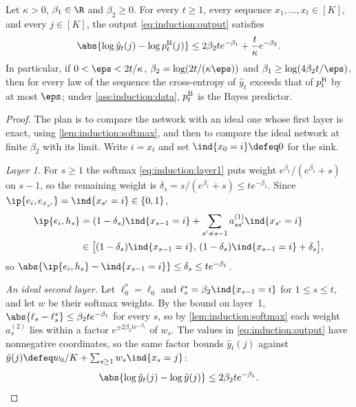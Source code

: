 \begin{refsection}
\begin{theorem}\label{thm:induction:circuit}
Let $\kappa>0$, $\beta_1\in\R$ and $\beta_2\ge0$. For every $t\ge1$, every sequence $x_1,\dots,x_t\in[K]$, and every $j\in[K]$, the output \eqref{eq:induction:output} satisfies
\begin{equation}\label{eq:induction:circuit}
  \abs{\log\hat y_t(j)-\log\indpb_t(j)}\le2\beta_2te^{-\beta_1}+\frac{t}{\kappa}e^{-\beta_2} .
\end{equation}
In particular, if $0<\eps<2t/\kappa$, $\beta_2=\log(2t/(\kappa\eps))$ and $\beta_1\ge\log(4\beta_2t/\eps)$, then for every law of the sequence the cross-entropy of $\hat y_t$ exceeds that of $p^{\mathrm{B}}_t$ by at most $\eps$; under \cref{ass:induction:data}, $p^{\mathrm{B}}_t$ is the Bayes predictor.
\end{theorem}

\begin{proof}
The plan is to compare the network with an ideal one whose first layer is exact, using \cref{lem:induction:softmax}, and then to compare the ideal network at finite $\beta_2$ with its limit. Write $i=x_t$ and set $\ind\{x_0=i\}\defeq0$ for the sink.

\emph{Layer 1.} For $s\ge1$ the softmax \eqref{eq:induction:layer1} puts weight $e^{\beta_1}/(e^{\beta_1}+s)$ on $s-1$, so the remaining weight is $\delta_s=s/(e^{\beta_1}+s)\le te^{-\beta_1}$. Since $\ip{e_i,e_{x_{s'}}}=\ind\{x_{s'}=i\}\in\{0,1\}$,
\begin{align*}
  \ip{e_i,h_s}&=(1-\delta_s)\ind\{x_{s-1}=i\}+\sum_{s'\ne s-1}a^{(1)}_{ss'}\ind\{x_{s'}=i\}\\
  &\in\bigl[(1-\delta_s)\ind\{x_{s-1}=i\},\,(1-\delta_s)\ind\{x_{s-1}=i\}+\delta_s\bigr],
\end{align*}
so $\abs{\ip{e_i,h_s}-\ind\{x_{s-1}=i\}}\le\delta_s\le te^{-\beta_1}$.

\emph{An ideal second layer.} Let $\ell^*_0=\ell_0$ and $\ell^*_s=\beta_2\ind\{x_{s-1}=i\}$ for $1\le s\le t$, and let $w$ be their softmax weights. By the bound on layer~1, $\abs{\ell_s-\ell^*_s}\le\beta_2te^{-\beta_1}$ for every $s$, so by \cref{lem:induction:softmax} each weight $a^{(2)}_s$ lies within a factor $e^{\pm2\beta_2te^{-\beta_1}}$ of $w_s$. The values in \eqref{eq:induction:output} have nonnegative coordinates, so the same factor bounds $\hat y_t(j)$ against $\tilde y(j)\defeq w_0/K+\sum_{s\ge1}w_s\ind\{x_s=j\}$:
\begin{equation}\label{eq:induction:step1}
  \abs{\log\hat y_t(j)-\log\tilde y(j)}\le2\beta_2te^{-\beta_1}.
\end{equation}


\end{proof}
\end{refsection}
